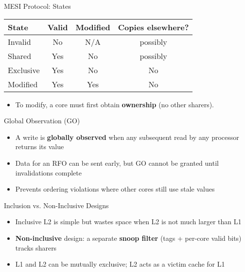 \documentclass[aspectratio=169,12pt]{beamer}
\begin{document}
\begin{frame}{MESI Protocol: States}
\begin{center}
\begin{tabular}{lccc}
\toprule
State & Valid & Modified & Copies elsewhere?\\
\midrule
Invalid   & No  & N/A  & possibly\\
Shared    & Yes & No   & possibly\\
Exclusive & Yes & No   & No\\
Modified  & Yes & Yes  & No\\
\bottomrule
\end{tabular}
\end{center}
\begin{itemize}
  \item To modify, a core must first obtain \textbf{ownership} (no other sharers).
\end{itemize}
\end{frame}

\begin{frame}{Global Observation (GO)}
\begin{itemize}
  \item A write is \textbf{globally observed} when any subsequent read by any processor returns its value
  \item Data for an RFO can be sent early, but GO cannot be granted until invalidations complete
  \item Prevents ordering violations where other cores still use stale values
\end{itemize}
\end{frame}

\begin{frame}{Inclusion vs. Non-Inclusive Designs}
\begin{itemize}
  \item Inclusive L2 is simple but wastes space when L2 is not much larger than L1
  \item \textbf{Non-inclusive} design: a separate \textbf{snoop filter} (tags + per-core valid bits) tracks sharers
  \item L1 and L2 can be mutually exclusive; L2 acts as a victim cache for L1
\end{itemize}
\end{frame}
\end{document}
